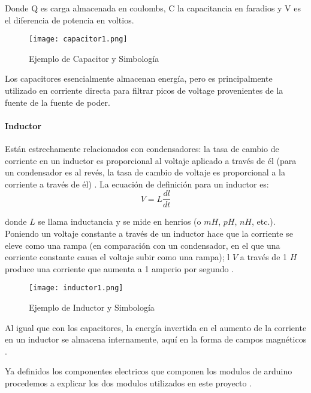\begin{nscenter}
	Donde Q es carga almacenada en coulombs, C la capacitancia en faradios y V es el diferencia de potencia en voltios.
\end{nscenter}

\begin{figure}[H]
	\centering
	\texttt{[image: capacitor1.png]}
	\caption{Ejemplo de Capacitor y Simbología}
\end{figure}

\par \noindent
Los capacitores esencialmente almacenan energía, pero es principalmente utilizado en corriente directa para filtrar picos de voltage provenientes de la fuente de la fuente de poder\cite{artofelectronics}.

\paragraph{Inductor}
Están estrechamente relacionados con condensadores: la tasa de cambio de corriente en un inductor es proporcional al voltaje aplicado a través de él (para un condensador es al revés, la tasa de cambio de voltaje es proporcional a la corriente a través de él) \cite{artofelectronics}. La ecuación de definición para un inductor es:
$$V = L\frac{dl}{dt}$$

\par \noindent
donde $L$ se llama inductancia y se mide en henrios
(o $mH$, $pH$, $nH$, etc.). Poniendo un voltaje constante a través de un
inductor hace que la corriente se eleve como una rampa (en comparación con un condensador, en el que una corriente constante causa el voltaje subir como una rampa); l $V$ a través de 1 $H$ produce una corriente que aumenta a 1 amperio por segundo \cite{artofelectronics}.

\begin{figure}[H]
	\centering
	\texttt{[image: inductor1.png]}
	\caption{Ejemplo de Inductor y Simbología}
\end{figure}

\par \noindent
Al igual que con los capacitores, la energía invertida en el aumento de la corriente en un inductor se almacena internamente, aquí en la forma de campos magnéticos \cite{artofelectronics}.

\par \noindent
Ya definidos los componentes electricos que componen los modulos de arduino procedemos a explicar los dos modulos utilizados en este proyecto \cite{artofelectronics}.

